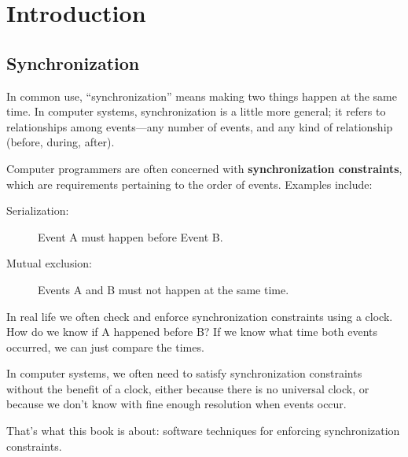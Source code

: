 \documentclass{book}
\begin{document}

\renewcommand\cftchapfont{\small\bfseries}
\renewcommand\cftsecfont{\footnotesize}
\renewcommand\cftsubsecfont{\footnotesize}
\renewcommand\cftchappagefont{\small\bfseries}
\renewcommand\cftsecpagefont{\footnotesize}
\renewcommand\cftsubsecpagefont{\footnotesize}

\setlength{\cftchapindent}{0px}
\setlength{\cftsecindent}{5px}
\setlength{\cftsubsecindent}{10px}

\tableofcontents


\mainmatter


\chapter{Introduction}

\section{Synchronization}
\label{synch}

In common use, ``synchronization'' means making two things happen at the same time.  In computer systems, synchronization is a little more general; it refers to relationships among events---any number of events, and any kind of relationship (before, during, after).

Computer programmers are often concerned with {\bf synchronization constraints}, which are requirements pertaining to the order of events.  Examples include:

\begin{description}
    \item[Serialization:] Event A must happen before Event B.
    \item[Mutual exclusion:] Events A and B must not happen at the same time.
\end{description}

In real life we often check and enforce synchronization constraints using a clock.  How do we know if A happened before B?  If we know what time both events occurred, we can just compare the times.

In computer systems, we often need to satisfy synchronization constraints without the benefit of a clock, either because there is no universal clock, or because we don't know with fine enough resolution when events occur.

That's what this book is about: software techniques for enforcing synchronization constraints.
\end{document}
